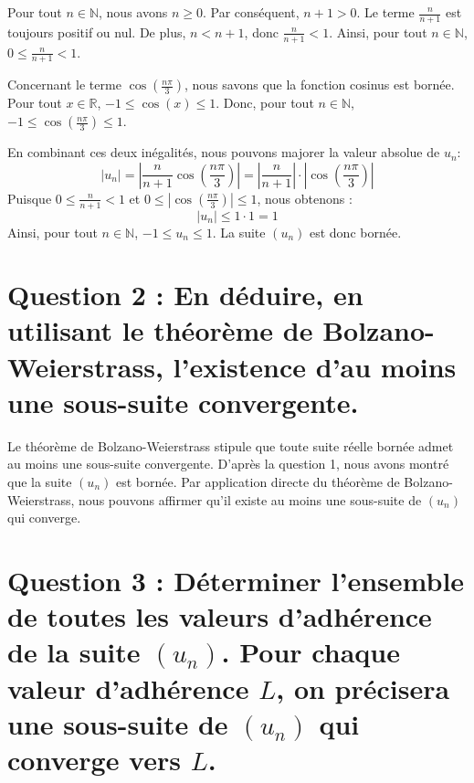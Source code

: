 \documentclass{report}
\begin{document}
Pour tout $n \in \mathbb{N}$, nous avons $n \ge 0$.
Par conséquent, $n+1 > 0$.
Le terme $\frac{n}{n+1}$ est toujours positif ou nul.
De plus, $n < n+1$, donc $\frac{n}{n+1} < 1$.
Ainsi, pour tout $n \in \mathbb{N}$, $0 \le \frac{n}{n+1} < 1$.

Concernant le terme $\cos\left(\frac{n\pi}{3}\right)$, nous savons que la fonction cosinus est bornée. Pour tout $x \in \mathbb{R}$, $-1 \le \cos(x) \le 1$.
Donc, pour tout $n \in \mathbb{N}$, $-1 \le \cos\left(\frac{n\pi}{3}\right) \le 1$.

En combinant ces deux inégalités, nous pouvons majorer la valeur absolue de $u_n$:
$$|u_n| = \left|\frac{n}{n+1} \cos\left(\frac{n\pi}{3}\right)\right| = \left|\frac{n}{n+1}\right| \cdot \left|\cos\left(\frac{n\pi}{3}\right)\right|$$
Puisque $0 \le \frac{n}{n+1} < 1$ et $0 \le \left|\cos\left(\frac{n\pi}{3}\right)\right| \le 1$, nous obtenons :
$$|u_n| \le 1 \cdot 1 = 1$$
Ainsi, pour tout $n \in \mathbb{N}$, $-1 \le u_n \le 1$.
La suite $(u_n)$ est donc bornée.

\section*{Question 2 : En déduire, en utilisant le théorème de Bolzano-Weierstrass, l'existence d'au moins une sous-suite convergente.}

Le théorème de Bolzano-Weierstrass stipule que toute suite réelle bornée admet au moins une sous-suite convergente.
D'après la question 1, nous avons montré que la suite $(u_n)$ est bornée.
Par application directe du théorème de Bolzano-Weierstrass, nous pouvons affirmer qu'il existe au moins une sous-suite de $(u_n)$ qui converge.

\section*{Question 3 : Déterminer l'ensemble de toutes les valeurs d'adhérence de la suite $(u_n)$. Pour chaque valeur d'adhérence $L$, on précisera une sous-suite de $(u_n)$ qui converge vers $L$.}
\end{document}
